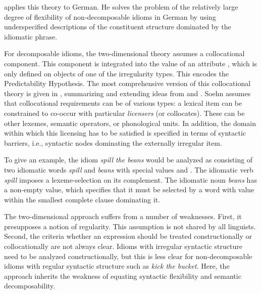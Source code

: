 \documentclass[output=paper]{langsci/langscibook}
\begin{document}
\cite{Soehn2006a} applies this theory to German. He solves the problem of the relatively large degree of flexibility of non-decomposable idioms in German
by using underspecified descriptions of the constituent structure dominated by the idiomatic phrase.

For decomposable idioms, the two-dimensional theory assumes a collocational component. This component is integrated into the value of an attribute , which is only defined on  objects of one of the irregularity types. 
This encodes the Predictability Hypothesis.
%
The most comprehensive version of this collocational theory is given in \cite{Soehn:09}, summarizing and extending ideas from \cite{Soehn2006a} and \cite{richter-soehn:2006}. 
Soehn assumes that collocational requirements can be of various types: 
a lexical item can be constrained to co-occur with particular \emph{licensers} (or collocates). These can be other lexemes, semantic operators, or phonological units. In addition, the domain within which this licensing has to be satisfied is specified in terms of syntactic barriers, i.e., syntactic nodes dominating the externally irregular item.

To give an example, the idiom \emph{spill the beans} would be analyzed as consisting of two  idiomatic words \emph{spill} and \emph{beans} with special  values  and . The idiomatic verb \emph{spill} imposes a lexeme-selection on its complement. The idiomatic noun \emph{beans} has a non-empty  value, which specifies that it must be selected by a word with  value  within the smallest complete clause dominating it.


\bigskip
The two-dimensional approach suffers from a number of weaknesses. 
First, it presupposes a notion of regularity. This assumption is not shared by all linguists.
Second, the criteria whether an expression should be treated constructionally or collocationally are not always clear. Idioms with irregular syntactic structure need to be analyzed constructionally, but this is less clear for non-decomposable idioms with regular syntactic structure such as \emph{kick the bucket}.
Here, the approach inherits the weakness of \cite{WSN84a-u} equating syntactic flexibility and semantic decomposability.

\end{document}
